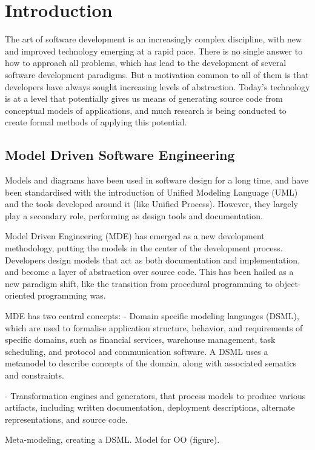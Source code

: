 \chapter{Introduction}
\label{chap:introduction}
 
The art of software development is an increasingly complex discipline, with
new and improved technology emerging at a rapid pace. There is no single answer
to how to approach all problems, which has lead to the development of several
software development paradigms. But a motivation common to all of them is that
developers have always sought increasing levels of abstraction. Today's
technology is at a level that potentially gives us means of generating source
code from conceptual models of applications, and much research is being
conducted to create formal methods of applying this potential.


\section{Model Driven Software Engineering}

Models and diagrams have been used in software design for a long time, and have
been standardised with the introduction of Unified Modeling Language (UML)
 and the tools developed around it (like Unified Process). However,
they largely play a secondary role, performing as design tools and
documentation.

Model Driven Engineering (MDE) has emerged as a new development methodology,
putting the models in the center of the development process. Developers design
models that act as both documentation and implementation, and become a layer of
abstraction over source code. This has been hailed as a new paradigm shift,
like the transition from procedural programming to object-oriented programming was.

MDE has two central concepts:
- Domain specific modeling languages (DSML), which are used to formalise application structure, behavior,
and requirements of specific domains, such as financial services, warehouse
management, task scheduling, and protocol and communication software. A DSML
uses a metamodel to describe concepts of the domain, along with associated
sematics and constraints. 

- Transformation engines and generators, that process models to produce various
artifacts, including written documentation, deployment descriptions,
alternate representations, and source code.

Meta-modeling, creating a DSML. Model for OO (figure).

